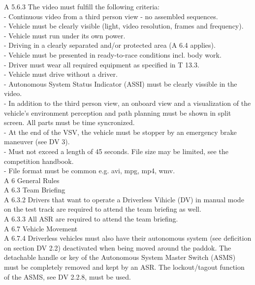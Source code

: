 \documentclass{article}
\begin{document}
A 5.6.3 The video must fulfill the following criteria:\\
	- Continuous video from a third person view - no assembled sequences.\\
	- Vehicle must be clearly visible (light, video resolution, frames and frequency).\\
	- Vehicle must run under its own power.\\
	- Driving in a clearly separated and/or protected area (A 6.4 applies).\\
	- Vehicle must be presented in ready-to-race conditions incl. body work.\\
	- Driver must wear all required equipment as specified in T 13.3.\\
	- Vehicle must drive without a driver.\\
	- Autonomous System Status Indicator (ASSI) must be clearly vissible in the video.\\
	- In addition to the third person view, an onboard view and a visualization of the vehicle's environment perception and path planning must be shown in split screen. All parts must be time syncronized.\\
	- At the end of the VSV, the vehicle must be stopper by an emergency brake maneuver (see DV 3).\\
	- Must not exceed a length of 45 seconds. File size may be limited, see the competition handbook.\\
	- File format must be common e.g. avi, mpg, mp4, wmv.\\

A 6 General Rules\\
	
A 6.3 Team Briefing\\

A 6.3.2 Drivers that want to operate a Driverless Vihicle (DV) in manual mode on the test track are required to attend the team briefing as well.\\

A 6.3.3 All ASR are required to attend the team briefing.\\

A 6.7 Vehicle Movement\\

A 6.7.4 Driverless vehicles must also have their autonomous system (see deficition on section DV 2.2) deactivated when being moved around the paddok. The detachable handle or key of the Autonomous System Master Switch (ASMS) must be completely removed and kept by an ASR. The lockout/tagout function of the ASMS, see DV 2.2.8, must be used.\\
\end{document}
